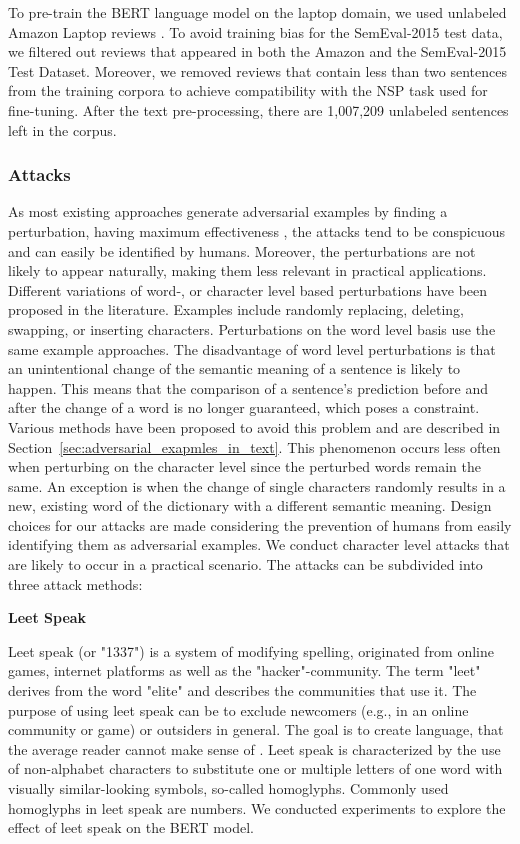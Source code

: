 To pre-train the BERT language model on the laptop domain, we used unlabeled Amazon Laptop reviews \cite{he2016ups}. To avoid training bias for the SemEval-2015 test data, we filtered out reviews that appeared in both the Amazon and the SemEval-2015 Test Dataset. Moreover, we removed reviews that contain less than two sentences from the training corpora to achieve compatibility with the NSP task used for fine-tuning. After the text pre-processing, there are 1,007,209 unlabeled sentences left in the corpus. 


\subsubsection{Attacks}
\label{sec:attacks_method}
As most existing approaches generate adversarial examples by finding a perturbation, having maximum effectiveness \cite{liang2017deep, ebrahimi2017hotflip, gao2018black, li2018textbugger, alzantot2018generating, jin2019bert, garg2020bae}, the attacks tend to be conspicuous and can easily be identified by humans. Moreover, the perturbations are not likely to appear naturally, making them less relevant in practical applications. Different variations of word-, or character level based perturbations have been proposed in the literature. 
Examples include randomly replacing, deleting, swapping, or inserting characters. Perturbations on the word level basis use the same example approaches.  
The disadvantage of word level perturbations is that an unintentional change of the semantic meaning of a sentence is likely to happen. This means that the comparison of a sentence's prediction before and after the change of a word is no longer guaranteed, which poses a constraint. Various methods have been proposed to avoid this problem and are described in Section~\ref{sec:adversarial_exapmles_in_text}. 
This phenomenon occurs less often when perturbing on the character level since the perturbed words remain the same. An exception is when the change of single characters randomly results in a new, existing word of the dictionary with a different semantic meaning. 
Design choices for our attacks are made considering the prevention of humans from easily identifying them as adversarial examples.
We conduct character level attacks that are likely to occur in a practical scenario. The attacks can be subdivided into three attack methods:


\textbf{Leet Speak}

Leet speak (or "1337") is a system of modifying spelling, originated from online games, internet platforms as well as the "hacker"-community. The term "leet" derives from the word "elite" and describes the communities that use it. The purpose of using leet speak can be to exclude newcomers (e.g., in an online community or game) or outsiders in general. The goal is to create language, that the average reader cannot make sense of \cite{thomas2002hacker}.
Leet speak is characterized by the use of non-alphabet characters to substitute one or multiple letters of one word with visually similar-looking symbols, so-called homoglyphs. Commonly used homoglyphs in leet speak are numbers. 
We conducted experiments to explore the effect of leet speak on the BERT model. 

